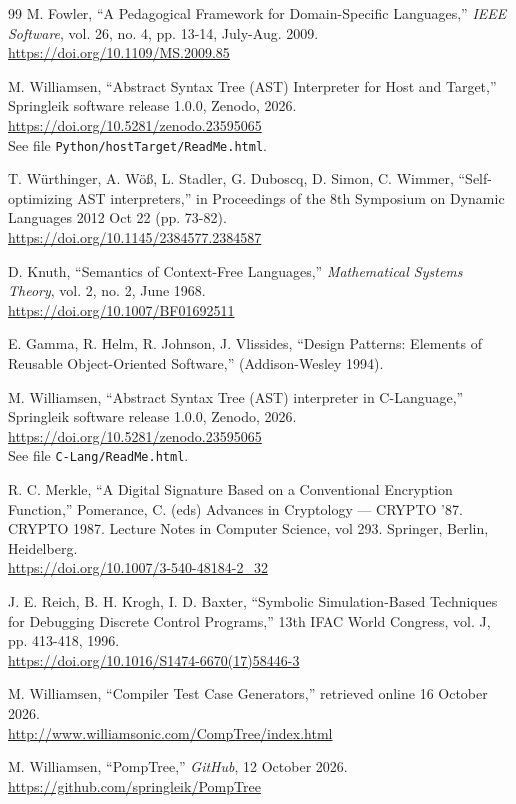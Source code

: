 \documentclass[a4paper,10pt]{article}
\begin{document}
\begin{thebibliography}{99}
M. Fowler, ``A Pedagogical Framework for Domain-Specific Languages,'' \textit{IEEE Software}, vol. 26, no. 4, pp. 13-14, July-Aug. 2009. \\
\url{https://doi.org/10.1109/MS.2009.85}

M. Williamsen, ``Abstract Syntax Tree (AST) Interpreter for Host and Target,''
Springleik software release 1.0.0, Zenodo, 2026. \\
\url{https://doi.org/10.5281/zenodo.23595065} \\
See file \texttt{Python/hostTarget/ReadMe.html}.

T. Würthinger, A. Wöß, L. Stadler, G. Duboscq, D. Simon, C. Wimmer, ``Self-optimizing AST interpreters,'' in Proceedings of the 8th Symposium on Dynamic Languages 2012 Oct 22 (pp. 73-82). \\
\url{https://doi.org/10.1145/2384577.2384587}

D. Knuth, ``Semantics of Context-Free Languages,''
\textit{Mathematical Systems Theory}, vol. 2, no. 2, June 1968. \\
\url{https://doi.org/10.1007/BF01692511}

E. Gamma, R. Helm, R. Johnson, J. Vlissides, ``Design Patterns: Elements of Reusable Object-Oriented Software,'' (Addison-Wesley 1994).

M. Williamsen, ``Abstract Syntax Tree (AST) interpreter in C-Language,''
Springleik software release 1.0.0, Zenodo, 2026. \\
\url{https://doi.org/10.5281/zenodo.23595065} \\
See file \texttt{C-Lang/ReadMe.html}.

R. C. Merkle, ``A Digital Signature Based on a Conventional Encryption Function,'' Pomerance, C. (eds) Advances in Cryptology — CRYPTO ’87. CRYPTO 1987. Lecture Notes in Computer Science, vol 293. Springer, Berlin, Heidelberg. \\
\url{https://doi.org/10.1007/3-540-48184-2_32}

J. E. Reich, B. H. Krogh, I. D. Baxter, ``Symbolic Simulation-Based Techniques for Debugging Discrete Control Programs,'' 13th IFAC World Congress, vol. J, pp. 413-418, 1996. \\
\url{https://doi.org/10.1016/S1474-6670(17)58446-3}

M. Williamsen, ``Compiler Test Case Generators,''
retrieved online 16 October 2026. \\
\url{http://www.williamsonic.com/CompTree/index.html}

M. Williamsen, ``PompTree,''
\textit{GitHub}, 12 October 2026. \\
\url{https://github.com/springleik/PompTree}

\end{thebibliography}
\end{document}
